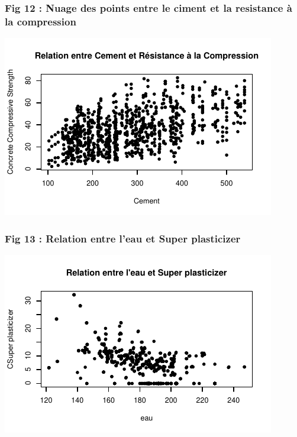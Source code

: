 \documentclass[
  12pt,
]{article}
\begin{document}
\subsubsection{Fig 12 : Nuage des points entre le ciment et la
resistance à la
compression}\label{fig-12-nuage-des-points-entre-le-ciment-et-la-resistance-uxe0-la-compression}

\begin{center}\includegraphics{rmd_final_files/figure-latex/unnamed-chunk-32-1} \end{center}

\subsubsection{Fig 13 : Relation entre l'eau et Super
plasticizer}\label{fig-13-relation-entre-leau-et-super-plasticizer}

\begin{center}\includegraphics{rmd_final_files/figure-latex/unnamed-chunk-33-1} \end{center}
\end{document}
